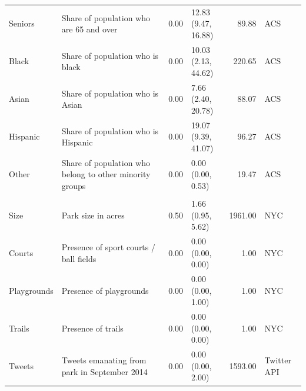 \documentclass[Afour,sageh.bst]{sagej}
\begin{document}
\begin{table}
{\begin{tabular}[t]{l>{\raggedright\arraybackslash}p{2in}rlrl}
\hspace{1em}Seniors & Share of population who are 65 and over & 0.00 & \makecell{12.83\\ (9.47, 16.88)} & 89.88 & ACS\\
\hspace{1em}Black & Share of population who is black & 0.00 & \makecell{10.03\\ (2.13, 44.62)} & 220.65 & ACS\\
\hspace{1em}Asian & Share of population who is Asian & 0.00 & \makecell{7.66\\ (2.40, 20.78)} & 88.07 & ACS\\
\hspace{1em}Hispanic & Share of population who is Hispanic & 0.00 & \makecell{19.07\\ (9.39, 41.07)} & 96.27 & ACS\\
\hspace{1em}Other & Share of population who belong to other minority groups & 0.00 & \makecell{0.00\\ (0.00, 0.53)} & 19.47 & ACS\\
\addlinespace[0.3em]
\multicolumn{6}{l}{\textbf{Park Variables, N = 1277}}\\
\hspace{1em}Size & Park size in acres & 0.50 & \makecell{1.66\\ (0.95, 5.62)} & 1961.00 & NYC\\
\hspace{1em}Courts & Presence of sport courts / ball fields & 0.00 & \makecell{0.00\\ (0.00, 0.00)} & 1.00 & NYC\\
\hspace{1em}Playgrounds & Presence of playgrounds & 0.00 & \makecell{0.00\\ (0.00, 1.00)} & 1.00 & NYC\\
\hspace{1em}Trails & Presence of trails & 0.00 & \makecell{0.00\\ (0.00, 0.00)} & 1.00 & NYC\\
\hspace{1em}Tweets & Tweets emanating from park in September 2014 & 0.00 & \makecell{0.00\\ (0.00, 2.00)} & 1593.00 & Twitter API\\
\bottomrule
\end{tabular}}
\end{table}
\end{document}
